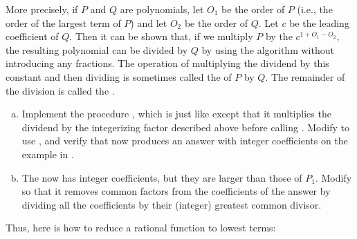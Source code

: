 More precisely, if \( P \) and \( Q \) are polynomials, let \( O_1 \) be the order of
\( P \) (i.e., the order of the largest term of \( P \)) and let \( O_2 \) be the
order of \( Q \).  Let \( c \) be the leading coefficient of \( Q \).  Then it can be
shown that, if we multiply \( P \) by the 
\( c^{1 + O_1 - O_2} \), the resulting polynomial can be divided by \( Q \) by
using the  algorithm without introducing any fractions.  The
operation of multiplying the dividend by this constant and then dividing is
sometimes called the  of \( P \) by \( Q \).  The remainder
of the division is called the .

\begin{exerciseGroup}
\label{Exercise 2.96}
\begin{enumerate}[a.]

\item
Implement the procedure , which is just like
 except that it multiplies the dividend by the
integerizing factor described above before calling .  Modify
 to use , and verify that
 now produces an answer with integer coefficients
on the example in .

\item
The  now has integer coefficients, but they are larger than those
of \( P_1 \).  Modify  so that it removes common factors from the
coefficients of the answer by dividing all the coefficients by their (integer)
greatest common divisor.

\end{enumerate}
\end{exerciseGroup}

\noindent
Thus, here is how to reduce a rational function to lowest terms:

